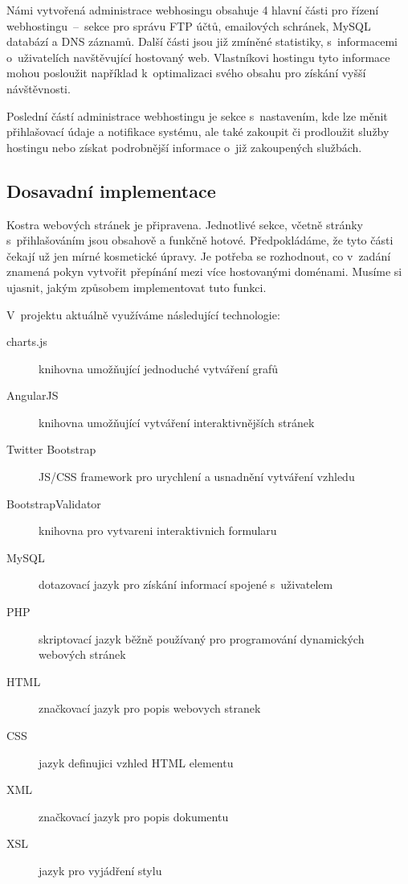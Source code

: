 \documentclass[11pt,a4paper]{article}
\begin{document}
    Námi vytvořená administrace webhosingu obsahuje 4 hlavní části pro řízení
    webhostingu \,--\, sekce pro správu FTP účtů, emailových schránek, MySQL databází
    a DNS záznamů. Další části jsou již zmíněné statistiky, s~informacemi
o~uživatelích navštěvující hostovaný web. Vlastníkovi hostingu tyto informace
    mohou posloužit například k~optimalizaci svého obsahu pro získání vyšší návštěvnosti.

    Poslední částí administrace webhostingu je sekce s~nastavením, kde lze měnit přihlašovací
    údaje a notifikace systému, ale také zakoupit či prodloužit služby hostingu
    nebo získat podrobnější informace o~již zakoupených službách.

    \subsection{Dosavadní implementace}

    Kostra webových stránek je připravena. Jednotlivé sekce, včetně stránky s~přihlašováním jsou
    obsahově a funkčně hotové. Předpokládáme, že tyto části čekají už jen mírné kosmetické
    úpravy. Je potřeba se rozhodnout, co v~zadání znamená pokyn vytvořit přepínání mezi více hostovanými doménami. 
    Musíme si ujasnit, jakým způsobem implementovat tuto funkci.

    V~projektu aktuálně využíváme následující technologie:
    \begin{description}
      \item[charts.js] knihovna umožňující jednoduché vytváření grafů
      \item[AngularJS] knihovna umožňující vytváření interaktivnějších stránek
      \item[Twitter Bootstrap] JS/CSS framework pro urychlení a usnadnění vytváření vzhledu
      \item[BootstrapValidator] knihovna pro vytvareni interaktivnich formularu
      \item[MySQL] dotazovací jazyk pro získání informací spojené s~uživatelem
      \item[PHP] skriptovací jazyk běžně používaný pro programování
                   dynamických webových stránek
      \item[HTML] značkovací jazyk pro popis webovych stranek
      \item[CSS] jazyk definujici vzhled HTML elementu
      \item[XML] značkovací jazyk pro popis dokumentu
      \item[XSL] jazyk pro vyjádření stylu
    \end{description}
\end{document}
